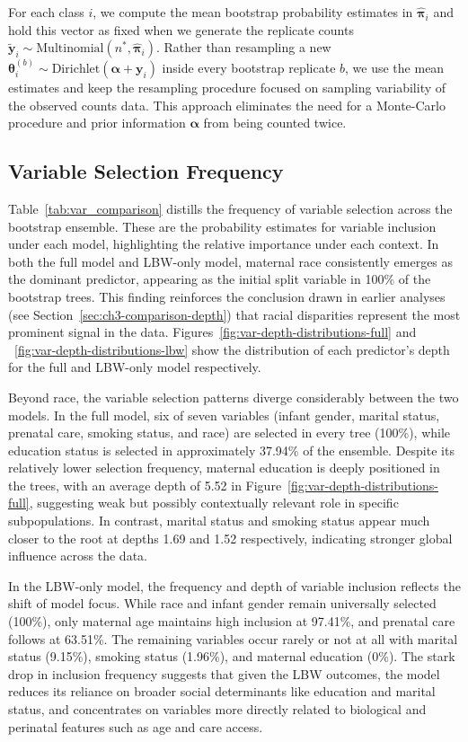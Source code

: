 For each class \(i\), we compute the mean bootstrap probability estimates in \(\hat{\boldsymbol{\pi}}_i\) and hold this vector as fixed when we generate the replicate counts \(\tilde{\mathbf{y}}_i \sim \mathrm{Multinomial}(n^\ast,\hat{\boldsymbol{\pi}}_i)\). Rather than resampling a new \(\boldsymbol{\theta}_i^{(b)} \sim \mathrm{Dirichlet}(\boldsymbol{\alpha} + \mathbf{y}_i)\) inside every bootstrap replicate \(b\), we use the mean estimates and keep the resampling procedure focused on sampling variability of the observed counts data. This approach eliminates the need for a Monte-Carlo procedure and prior information \(\boldsymbol{\alpha}\) from being counted twice.

\subsection{Variable Selection Frequency}
\label{ch3:boot-var-selection}
Table~\ref{tab:var_comparison} distills the frequency of variable selection across the bootstrap ensemble. These are the probability estimates for variable inclusion under each model, highlighting the relative importance under each context. In both the full model and LBW-only model, maternal race consistently emerges as the dominant predictor, appearing as the initial split variable in 100\% of the bootstrap trees. This finding reinforces the conclusion drawn in earlier analyses (see Section~\ref{sec:ch3-comparison-depth}) that racial disparities represent the most prominent signal in the data. Figures~\ref{fig:var-depth-distributions-full} and ~\ref{fig:var-depth-distributions-lbw} show the distribution of each predictor's depth for the full and LBW-only model respectively. 

Beyond race, the variable selection patterns diverge considerably between the two models. In the full model, six of seven variables (infant gender, marital status, prenatal care, smoking status, and race) are selected in every tree (100\%), while education status is selected in approximately 37.94\% of the ensemble. Despite its relatively lower selection frequency, maternal education is deeply positioned in the trees, with an average depth of 5.52 in Figure~\ref{fig:var-depth-distributions-full}, suggesting weak but possibly contextually relevant role in specific subpopulations. In contrast, marital status and smoking status appear much closer to the root at depths 1.69 and 1.52 respectively, indicating stronger global influence across the data. 

In the LBW-only model, the frequency and depth of variable inclusion reflects the shift of model focus. While race and infant gender remain universally selected (100\%), only maternal age maintains high inclusion at 97.41\%, and prenatal care follows at 63.51\%. The remaining variables occur rarely or not at all with marital status (9.15\%), smoking status (1.96\%), and maternal education (0\%). The stark drop in inclusion frequency suggests that given the LBW outcomes, the model reduces its reliance on broader social determinants like education and marital status, and concentrates on variables more directly related to biological and perinatal features such as age and care access. 

